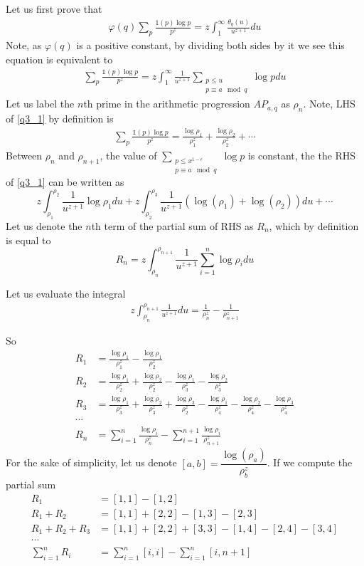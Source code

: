 \documentclass{article}
\theoremstyle{definition}
\theoremstyle{definition}
\theoremstyle{remark}
\begin{document}
	Let us first prove that 
	\begin{align}
		\varphi(q) \sum_p \frac{1(p) \log p}{p^z} = z \int_1^\infty \frac{\theta_q(u)}{u^{z+1}} du 
	\end{align}
	Note, as $\varphi(q)$ is a positive constant, by dividing both sides by it we see this equation is equivalent to 
	\begin{align}\label{q3_1}
		\sum_p \frac{\mathbb{1}(p) \log p}{p^z} 
		= z \int_1^\infty \frac{1}{u^{z+1}} \sum_{\substack{p \leq u  \\ p \equiv a \mod q}} \log p du
	\end{align}
	Let us label the $n$th prime in the arithmetic progression $AP_{a,q}$ as $\rho_n$. 
	Note, LHS of \eqref{q3_1} by definition is 
	\begin{align}\label{expected_pa}
		\sum_p \frac{\mathbb{1}(p) \log p}{p^z} = \frac{\log \rho_1}{\rho_1^z} + \frac{\log \rho_2}{\rho_2^z} + \cdots
	\end{align}
	Between $\rho_n$ and $\rho_{n+1}$, the value of $\sum_{\substack{p \leq x^{1-\epsilon} \\ p \equiv a \mod q}} \log p $ is constant, the the RHS of \eqref{q3_1} can be written as 
	$$
	z \int_{\rho_1}^{\rho_{2}} \frac{1}{u^{z+1}} \log \rho_1 du + z \int_{\rho_2}^{\rho_{3}} \frac{1}{u^{z+1}} (\log(\rho_1) + \log (\rho_2)) du + \cdots
	$$
	Let us denote the $n$th term of the partial sum of RHS as $R_n$, which by definition is equal to 
	$$
	R_n = z \int_{\rho_n}^{\rho_{n+1}} \frac{1}{u^{z+1}} \sum_{i = 1}^{n} \log \rho_i du
	$$
	
	Let us evaluate the integral
	\begin{align}
		z \int_{\rho_n}^{\rho_{n + 1}} \frac{1}{u^{z+1}} du = \frac{1}{\rho_n^z} - \frac{1}{\rho_{n+1}^z}
	\end{align}

	So 
	\begin{align*}
		R_1 &= \frac{\log \rho_1}{\rho_1^z} - \frac{\log \rho_1}{\rho_2^z} \\
		R_2 &= \frac{\log \rho_1}{\rho_2^z} + \frac{\log \rho_2}{\rho_2^z}  - \frac{\log \rho_1}{\rho_3^z} - \frac{\log \rho_2}{\rho_3^z}\\
		R_3 &= \frac{\log \rho_1}{\rho_3^z} + \frac{\log \rho_2}{\rho_3^z} + \frac{\log \rho_3}{\rho_2^z} - \frac{\log \rho_1}{\rho_4^z} - \frac{\log \rho_2}{\rho_4^z} - \frac{\log \rho_3}{\rho_4^z}\\
		\cdots \\
		R_n &= \sum_{i = 1}^n \frac{\log \rho _i}{\rho_n^z} - \sum_{i = 1}^{n+1} \frac{\log \rho_i}{\rho_{n+1}^z}
	\end{align*}
	For the sake of simplicity, let us denote $[a, b] = \dfrac{\log(\rho_a)}{\rho_b^z}$.
	If we compute the partial sum 
	\begin{align*}
		R_1 &= [1, 1] - [1, 2] \\
		R_1 + R_2  &= [1, 1] + [2, 2] - [1, 3] - [2, 3] \\
		R_1 + R_2 + R_3  &= [1, 1] + [2, 2] + [3, 3] - [1, 4] - [2, 4] - [3,4] \\
		\cdots \\ 
		\sum_{i = 1}^n R_i &= \sum_{i = 1}^n [i, i] - \sum_{i = 1}^{n} [i, n+1]
	\end{align*}
\end{document}
